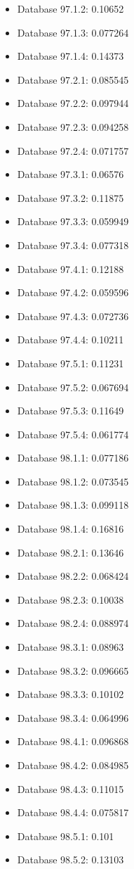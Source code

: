 \begin{itemize}
\item Database 97.1.2: 0.10652
\item Database 97.1.3: 0.077264
\item Database 97.1.4: 0.14373
\item Database 97.2.1: 0.085545
\item Database 97.2.2: 0.097944
\item Database 97.2.3: 0.094258
\item Database 97.2.4: 0.071757
\item Database 97.3.1: 0.06576
\item Database 97.3.2: 0.11875
\item Database 97.3.3: 0.059949
\item Database 97.3.4: 0.077318
\item Database 97.4.1: 0.12188
\item Database 97.4.2: 0.059596
\item Database 97.4.3: 0.072736
\item Database 97.4.4: 0.10211
\item Database 97.5.1: 0.11231
\item Database 97.5.2: 0.067694
\item Database 97.5.3: 0.11649
\item Database 97.5.4: 0.061774
\item Database 98.1.1: 0.077186
\item Database 98.1.2: 0.073545
\item Database 98.1.3: 0.099118
\item Database 98.1.4: 0.16816
\item Database 98.2.1: 0.13646
\item Database 98.2.2: 0.068424
\item Database 98.2.3: 0.10038
\item Database 98.2.4: 0.088974
\item Database 98.3.1: 0.08963
\item Database 98.3.2: 0.096665
\item Database 98.3.3: 0.10102
\item Database 98.3.4: 0.064996
\item Database 98.4.1: 0.096868
\item Database 98.4.2: 0.084985
\item Database 98.4.3: 0.11015
\item Database 98.4.4: 0.075817
\item Database 98.5.1: 0.101
\item Database 98.5.2: 0.13103

\end{itemize}
